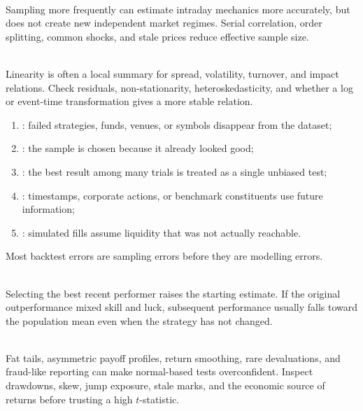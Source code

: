 \documentclass[a4paper,oneside,openany]{book}
\begin{document}
\begin{caveat} \\
Sampling more frequently can estimate intraday mechanics more accurately, but does not create new independent market regimes. Serial correlation, order splitting, common shocks, and stale prices reduce effective sample size.
\end{caveat}

\begin{caveat} \\
Linearity is often a local summary for spread, volatility, turnover, and impact relations. Check residuals, non-stationarity, heteroskedasticity, and whether a log or event-time transformation gives a more stable relation.
\end{caveat}

\begin{taxonomy} 
\begin{enumerate}[label=\roman*.]
\setlength{\itemsep}{0pt}
\item {}: failed strategies, funds, venues, or symbols disappear from the dataset;
\item {}: the sample is chosen because it already looked good;
\item {}: the best result among many trials is treated as a single unbiased test;
\item {}: timestamps, corporate actions, or benchmark constituents use future information;
\item {}: simulated fills assume liquidity that was not actually reachable.
\end{enumerate}
Most backtest errors are sampling errors before they are modelling errors.
\end{taxonomy}

\begin{caveat} \\
Selecting the best recent performer raises the starting estimate. If the original outperformance mixed skill and luck, subsequent performance usually falls toward the population mean even when the strategy has not changed.
\end{caveat}

\begin{caveat} \\
Fat tails, asymmetric payoff profiles, return smoothing, rare devaluations, and fraud-like reporting can make normal-based tests overconfident. Inspect drawdowns, skew, jump exposure, stale marks, and the economic source of returns before trusting a high $t$-statistic.
\end{caveat}
\end{document}
